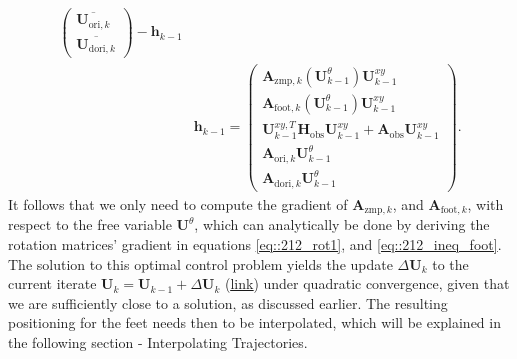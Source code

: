 \begin{align}
\begin{pmatrix}
		\overline{\bm{U}_{\text{ori},k}}\\
		\overline{\bm{U}_{\text{dori},k}}
	\end{pmatrix}-\bm{h}_{k-1}\\
	&\bm{h}_{k-1} =\begin{pmatrix}
		\bm{A}_{\text{zmp},k}(\bm{U}^\theta_{k-1})\bm{U}_{k-1}^{xy} \\
		\bm{A}_{\text{foot},k}(\bm{U}^\theta_{k-1})\bm{U}_{k-1}^{xy} \\
		\bm{U}_{k-1}^{xy,T}\bm{H}_{\text{obs}}\bm{U}_{k-1}^{xy}+\bm{A}_{\text{obs}}\bm{U}_{k-1}^{xy} \\
		\bm{A}_{\text{ori},k}\bm{U}_{k-1}^\theta\\
		\bm{A}_{\text{dori},k}\bm{U}_{k-1}^\theta
	\end{pmatrix}.
\end{align}
It follows that we only need to compute the gradient of $\bm{A}_{\text{zmp},k}$, and $\bm{A}_{\text{foot},k}$, with respect to the free variable $\bm{U}^{\theta}$, which can analytically be done by deriving the rotation matrices' gradient in equations \ref{eq::212_rot1}, and \ref{eq::212_ineq_foot}. The solution to this optimal control problem yields the update $\Delta\bm{U}_k$ to the current iterate $\bm{U}_k=\bm{U}_{k-1}+\Delta\bm{U}_k$ (\href{https://github.com/mhubii/nmpc_pattern_generator/blob/dc1f5a9366cbbbf76f1b02cada642f6ac9a04c89/libs/pattern_generator/src/nmpc_generator.cpp#L155}{\underline{link}}) under quadratic convergence, given that we are sufficiently close to a solution, as discussed earlier. The resulting positioning for the feet needs then to be interpolated, which will be explained in the following section - Interpolating Trajectories. 